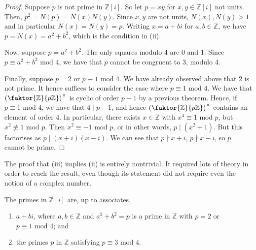 \begin{proof}
	Suppose \( p \) is not prime in \( \mathbb Z[i] \).
	So let \( p = xy \) for \( x, y \in \mathbb Z[i] \) not units.
	Then, \( p^2 = N(p) = N(x)N(y) \).
	Since \( x, y \) are not units, \( N(x), N(y) > 1 \) and in particular \( N(x) = N(y) = p \).
	Writing \( x = a+bi \) for \( a, b \in \mathbb Z \), we have \( p = N(x) = a^2 + b^2 \), which is the condition in (ii).

	Now, suppose \( p = a^2 + b^2 \).
	The only squares modulo 4 are 0 and 1.
	Since \( p \equiv a^2 + b^2 \text{ mod } 4 \), we have that \( p \) cannot be congruent to 3, modulo 4.

	Finally, suppose \( p = 2 \) or \( p \equiv 1 \text{ mod } 4 \).
	We have already observed above that 2 is not prime.
	It hence suffices to consider the case where \( p \equiv 1 \text{ mod } 4 \).
	We have that \( \qty(\faktor{\mathbb Z}{p\mathbb Z})^\times \) is cyclic of order \( p-1 \) by a previous theorem.
	Hence, if \( p \equiv 1 \text{ mod } 4 \), we have that \( 4 \mid p-1 \), and hence \( \qty(\faktor{\mathbb Z}{p\mathbb Z})^\times \) contains an element of order 4.
	In particular, there exists \( x \in \mathbb Z \) with \( x^4 \equiv 1 \text{ mod } p \), but \( x^2 \not\equiv 1 \text{ mod } p \).
	Then \( x^2 \equiv -1 \text{ mod } p \), or in other words, \( p \mid (x^2 + 1) \).
	But this factorises as \( p \mid (x+i)(x-i) \).
	We can see that \( p \nmid x+i \), \( p \nmid x-i \), so \( p \) cannot be prime.
\end{proof}
\begin{remark}
	The proof that (iii) implies (ii) is entirely nontrivial.
	It required lots of theory in order to reach the result, even though its statement did not require even the notion of a complex number.
\end{remark}
\begin{theorem}
	The primes in \( \mathbb Z[i] \) are, up to associates,
	\begin{enumerate}
		\item \( a + bi \), where \( a, b \in \mathbb Z \) and \( a^2 + b^2 = p \) is a prime in \( \mathbb Z \) with \( p = 2 \) or \( p \equiv 1 \text{ mod } 4 \); and
		\item the primes \( p \) in \( \mathbb Z \) satisfying \( p \equiv 3 \text{ mod } 4 \).
	\end{enumerate}
\end{theorem}
